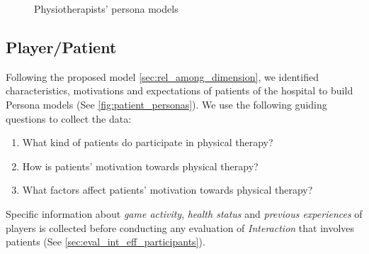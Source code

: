 \begin{figure}[bth]
\centering
\caption{Physiotherapists' persona models}
\label{fig:physio_personas}
\end{figure}

\subsection{Player/Patient}
Following the proposed model \autoref{sec:rel_among_dimension}, we identified characteristics, motivations and expectations of patients of the hospital to build Persona models (See \autoref{fig:patient_personas}). We use the following guiding questions to collect the data:

\begin{enumerate}
    \item What kind of patients do participate in physical therapy?
    \item How is patients' motivation towards physical therapy?
    \item What factors affect patients' motivation towards physical therapy?
\end{enumerate}

Specific information about \textit{game activity}, \textit{health status} and \textit{previous experiences} of players is collected before conducting any evaluation of \emph{Interaction} that involves patients (See \autoref{sec:eval_int_eff_participants}).

